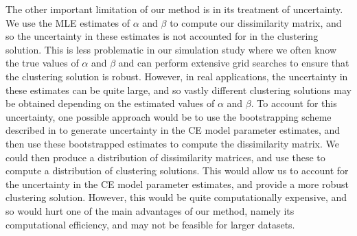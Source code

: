 \documentclass[12pt]{article}
\DeclareMathOperator{\CE}{\mathrm{CE}}
\begin{document}
The other important limitation of our method is in its treatment of uncertainty. 
We use the MLE estimates of $\alpha$ and $\beta$ to compute our dissimilarity matrix, and so the uncertainty in these estimates is not accounted for in the clustering solution.
This is less problematic in our simulation study where we often know the true values of $\alpha$ and $\beta$ and can perform extensive grid searches to ensure that the clustering solution is robust.
However, in real applications, the uncertainty in these estimates can be quite large, and so vastly different clustering solutions may be obtained depending on the estimated values of $\alpha$ and $\beta$.
To account for this uncertainty, one possible approach would be to use the bootstrapping scheme described in \citet{Heffernan2004} to generate uncertainty in the CE model parameter estimates, and then use these bootstrapped estimates to compute the dissimilarity matrix.
We could then produce a distribution of dissimilarity matrices, and use these to compute a distribution of clustering solutions.
This would allow us to account for the uncertainty in the CE model parameter estimates, and provide a more robust clustering solution.
However, this would be quite computationally expensive, and so would hurt one of the main advantages of our method, namely its computational efficiency, and may not be feasible for larger datasets.


\end{document}
